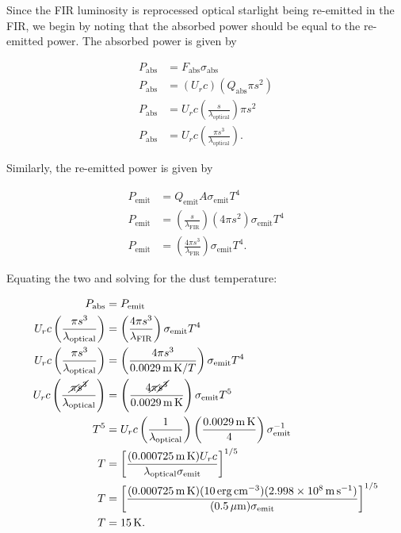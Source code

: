 \documentclass[12pt]{article}
\begin{document}
Since the FIR luminosity is reprocessed optical starlight being re-emitted in the FIR, we begin by noting that the absorbed power should be equal to the re-emitted power. The absorbed power is given by 

\begin{align*}
    P_\mathrm{abs} &= F_\mathrm{abs}\sigma_\mathrm{abs} \\
    P_\mathrm{abs} &= (U_rc) (Q_\mathrm{abs}\pi s^2) \\
    P_\mathrm{abs} &= U_rc \left(\frac{s}{\lambda_\mathrm{optical}}\right) \pi s^2 \\
    P_\mathrm{abs} &= U_rc \left(\frac{\pi s^3}{\lambda_\mathrm{optical}}\right).
\end{align*}

{\noindent}Similarly, the re-emitted power is given by

\begin{align*}
    P_\mathrm{emit} &= Q_\mathrm{emit} A \sigma_\mathrm{emit} T^4 \\
    P_\mathrm{emit} &= \left(\frac{s}{\lambda_\mathrm{FIR}}\right) (4\pi s^2) \sigma_\mathrm{emit} T^4 \\
    P_\mathrm{emit} &= \left(\frac{4\pi s^3}{\lambda_\mathrm{FIR}}\right) \sigma_\mathrm{emit} T^4.
\end{align*}

{\noindent}Equating the two and solving for the dust temperature:

\begin{align*}
    P_\mathrm{abs} &= P_\mathrm{emit} \\
    U_rc \left(\frac{\pi s^3}{\lambda_\mathrm{optical}}\right) &= \left(\frac{4\pi s^3}{\lambda_\mathrm{FIR}}\right) \sigma_\mathrm{emit} T^4 \\
    U_rc \left(\frac{\pi s^3}{\lambda_\mathrm{optical}}\right) &= \left(\frac{4\pi s^3}{0.0029\,\mathrm{m\,K}/T}\right) \sigma_\mathrm{emit} T^4 \\
    U_rc \left(\frac{\cancel{\pi} \cancel{s^3}}{\lambda_\mathrm{optical}}\right) &= \left(\frac{4\cancel{\pi} \cancel{s^3}}{0.0029\,\mathrm{m\,K}}\right) \sigma_\mathrm{emit} T^5 \\
    T^5 &= U_rc \left(\frac{1}{\lambda_\mathrm{optical}}\right) \left(\frac{0.0029\,\mathrm{m\,K}}{4}\right) \sigma_\mathrm{emit}^{-1} \\
    T &= \left[\frac{(0.000725\,\mathrm{m\,K}) U_rc}{\lambda_\mathrm{optical}\sigma_\mathrm{emit}}\right]^{1/5} \\
    T &= \left[\frac{(0.000725\,\mathrm{m\,K}) (10\,\mathrm{erg\,cm^{-3}})(2.998\times10^8\,\mathrm{m\,s^{-1}})}{(0.5\,\mu\mathrm{m})\sigma_\mathrm{emit}}\right]^{1/5} \\
    T &= 15 \,\mathrm{K}.
\end{align*}
\end{document}
